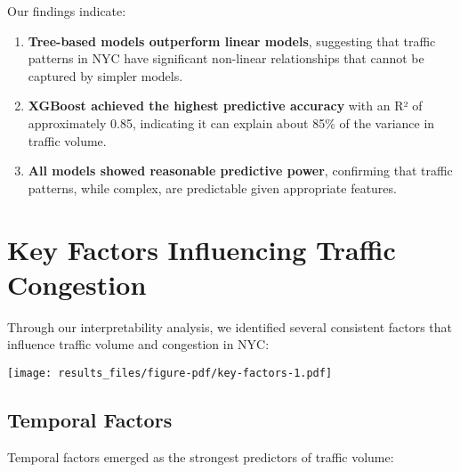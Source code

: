\documentclass[
  letterpaper,
  DIV=11,
  numbers=noendperiod]{scrreprt}
\begin{document}
Our findings indicate:

\begin{enumerate}
\def\labelenumi{\arabic{enumi}.}
\item
  \textbf{Tree-based models outperform linear models}, suggesting that
  traffic patterns in NYC have significant non-linear relationships that
  cannot be captured by simpler models.
\item
  \textbf{XGBoost achieved the highest predictive accuracy} with an R²
  of approximately 0.85, indicating it can explain about 85\% of the
  variance in traffic volume.
\item
  \textbf{All models showed reasonable predictive power}, confirming
  that traffic patterns, while complex, are predictable given
  appropriate features.
\end{enumerate}

\section{Key Factors Influencing Traffic
Congestion}\label{key-factors-influencing-traffic-congestion}

Through our interpretability analysis, we identified several consistent
factors that influence traffic volume and congestion in NYC:

\texttt{[image: results\_files/figure-pdf/key-factors-1.pdf]}

\subsection{Temporal Factors}\label{temporal-factors}

Temporal factors emerged as the strongest predictors of traffic volume:
\end{document}
